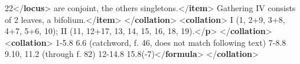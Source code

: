 \begin{shaded}
\hspace*{1em}\hspace*{1em}22{</\textbf{locus}>} are conjoint, the others singletons.{</\textbf{item}>}\mbox{}\newline 
\hspace*{1em}\hspace*{1em}Gathering IV consists of 2 leaves, a bifolium.{</\textbf{item}>}\mbox{}\newline 
\hspace*{1em}\mbox{}\newline 
{}\mbox{}\newline 
{</\textbf{collation}>}\mbox{}\newline 
{<\textbf{collation}>}\mbox{}\newline 
{}I (1, 2+9, 3+8, 4+7, 5+6, 10); II (11, 12+17, 13, 14, 15, 16, 18,\mbox{}\newline 
\hspace*{1em}\hspace*{1em} 19).{</\textbf{p}>}\mbox{}\newline 
{</\textbf{collation}>}\mbox{}\newline 
{<\textbf{collation}>}\mbox{}\newline 
{}\mbox{}\newline 
\hspace*{1em}1-5.8 6.6 (catchword, f. 46, does not match following text) 7-8.8\mbox{}\newline 
\hspace*{1em}\hspace*{1em}\hspace*{1em}\hspace*{1em} 9.10, 11.2 (through f. 82) 12-14.8 15.8(-7){</\textbf{formula}>}\mbox{}\newline 
{}\mbox{}\newline 
{</\textbf{collation}>}\end{shaded}\egroup\par 
